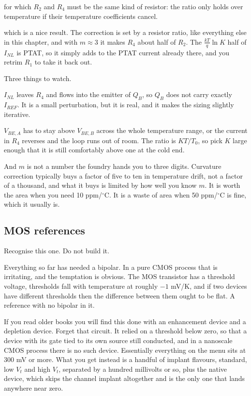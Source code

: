 for which \(R_2\) and \(R_4\) must be the same kind of resistor: the
ratio only holds over temperature if their temperature coefficients
cancel.

which is a nice result. The correction is set by a resistor ratio, like
everything else in this chapter, and with \(m \approx 3\) it makes
\(R_4\) about half of \(R_2\). The \(\frac{kT}{q}\ln{K}\) half of
\(I_{NL}\) is PTAT, so it simply adds to the PTAT current already there,
and you retrim \(R_1\) to take it back out.

Three things to watch.

\(I_{NL}\) leaves \(R_4\) and flows into the emitter of \(Q_B\), so
\(Q_B\) does not carry exactly \(I_{REF}\). It is a small perturbation,
but it is real, and it makes the sizing slightly iterative.

\(V_{BE,A}\) has to stay above \(V_{BE,B}\) across the whole temperature
range, or the current in \(R_4\) reverses and the loop runs out of room.
The ratio is \(K T/T_0\), so pick \(K\) large enough that it is still
comfortably above one at the cold end.

And \(m\) is not a number the foundry hands you to three digits.
Curvature correction typically buys a factor of five to ten in
temperature drift, not a factor of a thousand, and what it buys is
limited by how well you know \(m\). It is worth the area when you need
10 ppm/\(^\circ\)C. It is a waste of area when 50 ppm/\(^\circ\)C is
fine, which it usually is.

\subsection{MOS references}\label{mos-references}

\emph{} Recognise this one. Do not build it. \emph{}

Everything so far has needed a bipolar. In a pure CMOS process that is
irritating, and the temptation is obvious. The MOS transistor has a
threshold voltage, thresholds fall with temperature at roughly \(-1\)
mV/K, and if two devices have different thresholds then the difference
between them ought to be flat. A reference with no bipolar in it.

If you read older books you will find this done with an enhancement
device and a depletion device. Forget that circuit. It relied on a
threshold below zero, so that a device with its gate tied to its own
source still conducted, and in a nanoscale CMOS process there is no such
device. Essentially everything on the menu sits at 300 mV or more. What
you get instead is a handful of implant flavours, standard, low \(V_t\)
and high \(V_t\), separated by a hundred millivolts or so, plus the
native device, which skips the channel implant altogether and is the
only one that lands anywhere near zero.

